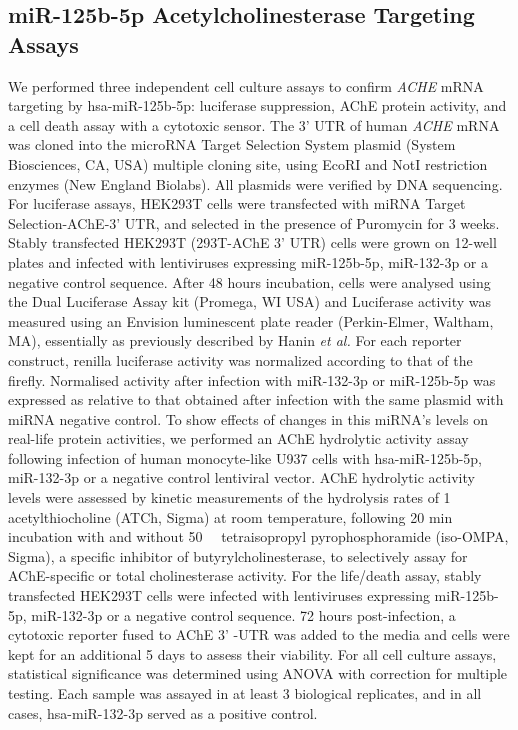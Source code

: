 \begin{method}

\subsection{miR-125b-5p Acetylcholinesterase Targeting Assays}
We performed three independent cell culture assays to confirm \emph{ACHE} mRNA targeting by hsa-miR-125b-5p: luciferase suppression, AChE protein activity, and a cell death assay with a cytotoxic sensor. The 3' UTR of human \emph{ACHE} mRNA\cite{Soreq1990} was cloned into the microRNA Target Selection System plasmid (System Biosciences, CA, USA) multiple cloning site, using EcoRI and NotI restriction enzymes (New England Biolabs). All plasmids were verified by DNA sequencing. For luciferase assays, HEK293T cells were transfected with miRNA Target Selection-AChE-3' UTR, and selected in the presence of Puromycin for 3 weeks. Stably transfected HEK293T (293T-AChE 3' UTR) cells were grown on 12-well plates and infected with lentiviruses expressing miR-125b-5p, miR-132-3p or a negative control sequence. After 48 hours incubation, cells were analysed using the Dual Luciferase Assay kit (Promega, WI USA) and Luciferase activity was measured using an Envision luminescent plate reader (Perkin-Elmer, Waltham, MA), essentially as previously described by Hanin \emph{et al.}\cite{Hanin2014} For each reporter construct, renilla luciferase activity was normalized according to that of the firefly. Normalised activity after infection with miR-132-3p or miR-125b-5p was expressed as relative to that obtained after infection with the same plasmid with miRNA negative control. To show effects of changes in this miRNA’s levels on real-life protein activities, we performed an AChE hydrolytic activity assay following infection of human monocyte-like U937 cells with hsa-miR-125b-5p, miR-132-3p or a negative control lentiviral vector. AChE hydrolytic activity levels were assessed by kinetic measurements of the hydrolysis rates of \SI{1}{\milli\Molar} acetylthiocholine (ATCh, Sigma) at room temperature, following 20 min incubation with and without \SI{50}{\micro\Molar} tetraisopropyl pyrophosphoramide (iso-OMPA, Sigma), a specific inhibitor of butyrylcholinesterase, to selectively assay for AChE-specific or total cholinesterase activity. For the life/death assay, stably transfected HEK293T cells were infected with lentiviruses expressing miR-125b-5p, miR-132-3p or a negative control sequence. 72 hours post-infection, a cytotoxic reporter fused to AChE 3' -UTR was added to the media and cells were kept for an additional 5 days to assess their viability. For all cell culture assays, statistical significance was determined using ANOVA with correction for multiple testing. Each sample was assayed in at least 3 biological replicates, and in all cases, hsa-miR-132-3p served as a positive control.

\end{method}

